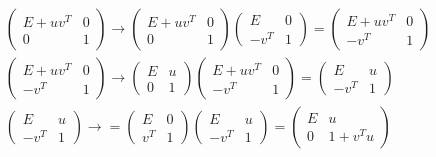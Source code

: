 \begin{sol}
    \begin{gather*}
    \left(
        \begin{array}{cc}
            E +  u v^{T} &  0\\
           0  & 1
        \end{array}
        \right) \rightarrow  
        \left(
        \begin{array}{cc}
            E +  u v^{T} &  0\\
           0  & 1
        \end{array}
        \right)
        \left(
        \begin{array}{cc}
            E &  0\\
           -v^{T}  & 1
        \end{array}
        \right) = \left(
        \begin{array}{cc}
            E +  u v^{T} &  0\\
           -v^T  & 1
        \end{array}
        \right) \\
        \left(
         \begin{array}{cc}
            E +  u v^{T} &  0\\
           -v^T  & 1
        \end{array}\right) \rightarrow
        \left(
         \begin{array}{cc}
            E  &  u\\
           0  & 1
        \end{array}
        \right)
        \left(
         \begin{array}{cc}
            E +  u v^{T} &  0\\
           -v^T  & 1
        \end{array}
        \right) =
        \left(
         \begin{array}{cc}
            E &  u\\
           -v^T  & 1
        \end{array}
        \right) \\ 
        \left(
         \begin{array}{cc}
            E &  u\\
           -v^T  & 1
        \end{array}
        \right) \rightarrow
        =
        \left(
         \begin{array}{cc}
            E &  0\\
           v^T  & 1
        \end{array}
        \right) 
        \left(
         \begin{array}{cc}
            E &  u\\
           -v^T  & 1
        \end{array}
        \right) = 
        \left(
         \begin{array}{cc}
            E &  u\\
           0  & 1 + v^T u
        \end{array}
        \right)
    \end{gather*}
    

\end{sol}
